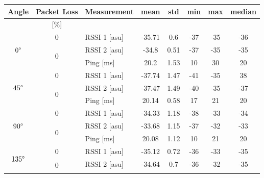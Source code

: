 \begin{table}[H]
    \centering
    \begin{tabular}{|c|c|l|c|c|c|c|c|}
    \hline
        Angle & Packet Loss & Measurement & mean & std & min & max & median \\\hline
        [\degree] & [\%] &  &  &  &  &  &  \\\hline\hline
        \multirow{3}{*}{$0\degree$} & \multirow{1}{*}{0} & RSSI 1 [asu] & -35.71 & 0.6 & -37 & -35 & -36 \\\cline{2-8}\cline{2-8}
        & \multirow{2}{*}{0} & RSSI 2 [asu] & -34.8 & 0.51 & -37 & -35 & -35 \\\cline{3-8}
        && Ping [ms] & 20.2 & 1.53 & 10 & 30 & 20 \\\hline\hline
        \multirow{3}{*}{$45\degree$} & \multirow{1}{*}{0} & RSSI 1 [asu] & -37.74 & 1.47 & -41 & -35 & 38 \\\cline{2-8}\cline{2-8}
        & \multirow{2}{*}{0} & RSSI 2 [asu] & -37.47 &1.49 & -40 & -35 & -37 \\\cline{3-8}
        && Ping [ms] & 20.14 & 0.58 & 17 & 21 & 20 \\\hline\hline
        \multirow{3}{*}{$90\degree$} & \multirow{1}{*}{0} & RSSI 1 [asu] & -34.33 & 1.18 & -38 & -33 & -34 \\\cline{2-8}\cline{2-8}
        & \multirow{2}{*}{0} & RSSI 2 [asu] & -33.68 & 1.15 & -37 & -32 & -33 \\\cline{3-8}
        && Ping [ms] & 20.08 & 1.12 & 10 & 21 & 20 \\\hline\hline
        \multirow{3}{*}{$135\degree$} & \multirow{1}{*}{0} & RSSI 1 [asu] & -35.12 & 0.72 & -36 & -33 & -35 \\\cline{2-8}\cline{2-8}
        & \multirow{2}{*}{0} & RSSI 2 [asu] & -34.64 & 0.7 & -36 & -32 & -35 \\\cline{3-8}

\end{tabular}
\end{table}
